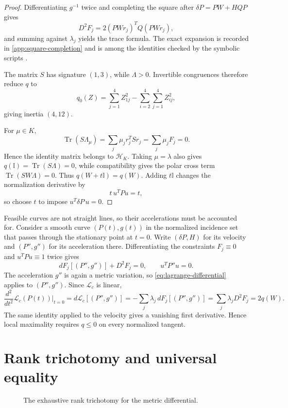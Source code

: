 \documentclass[11pt]{article}
\theoremstyle{definition}
\newcommand{\Tr}{\operatorname{Tr}}
\newcommand{\id}{\mathbb I}
\begin{document}
\begin{proof}
Differentiating \(g^{-1}\) twice and completing the square after
\(\delta P=PW+HQ P\) gives
\[
D^2F_j=2(PWr_j)^TQ(PWr_j),
\]
and summing against \(\lambda_j\) yields the trace formula. The exact
expansion is recorded in \cref{app:square-completion} and is among the
identities checked by the symbolic scripts \cite{kriebel2026verification}.

The matrix \(S\) has signature \((1,3)\), while \(\Lambda>0\).
Invertible congruences therefore reduce \(q\) to
\[
q_0(Z)=\sum_{j=1}^4Z_{1j}^2-
\sum_{i=2}^4\sum_{j=1}^4Z_{ij}^2,
\]
giving inertia \((4,12)\).

For \(\mu\in K\),
\[
\Tr(S\Lambda_\mu)=\sum_j\mu_jr_j^TSr_j
=\sum_j\mu_jF_j=0.
\]
Hence the identity matrix belongs to \(\mathcal H_K\). Taking
\(\mu=\lambda\) also gives \(q(\id)=\Tr(S\Lambda)=0\), while compatibility
gives the polar cross term \(\Tr(SW\Lambda)=0\). Thus
\(q(W+t\id)=q(W)\). Adding \(t\id\) changes the normalization derivative
by
\[
t\,u^TPu=t,
\]
so choose \(t\) to impose \(u^T\delta P\,u=0\).
\end{proof}

Feasible curves are not straight lines, so their accelerations must be
accounted for. Consider a smooth curve \((P(t),g(t))\) in the normalized
incidence set that passes through the stationary point at \(t=0\). Write
\((\delta P,H)\) for its velocity and \((P'',g'')\) for its acceleration
there. Differentiating the constraints \(F_j\equiv0\) and
\(u^TPu\equiv1\) twice gives
\[
dF_j[(P'',g'')]+D^2F_j=0,\qquad u^TP''u=0 .
\]
The acceleration \(g''\) is again a metric variation, so
\eqref{eq:lagrange-differential} applies to \((P'',g'')\). Since
\(\mathcal L_c\) is linear,
\[
\frac{d^2}{dt^2}\mathcal L_c(P(t))\big|_{t=0}
=d\mathcal L_c[(P'',g'')]
=-\sum_j\lambda_j\,dF_j[(P'',g'')]
=\sum_j\lambda_jD^2F_j=2q(W).
\]
The same identity applied to the velocity gives a vanishing first
derivative. Hence local maximality requires \(q\le0\) on every normalized
tangent.

\section{Rank trichotomy and universal equality}
\label{sec:closure}

\begin{figure}[t]
\centering
\resizebox{\textwidth}{!}{}
\caption{The exhaustive rank trichotomy for the metric differential.}
\label{fig:trichotomy}
\end{figure}
\end{document}
